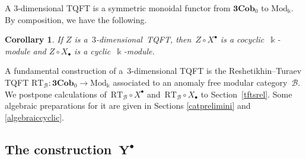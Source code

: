\documentclass[10pt,a4paper]{amsart}
\numberwithin{equation}{section}
\newtheorem{Corollary}[Theorem]{Corollary}
\newcommand{\co}{\colon}
\newcommand{\mc}{\mathcal}
\newcommand{\Mod}{\mathrm{Mod}}
\newcommand{\Cob}{\textbf{Cob}}
\newcommand{\kk}{\Bbbk}
\newcommand{\RT}{\text{RT}}
\begin{document}
A $3$-dimensional TQFT is a symmetric monoidal functor from $\textbf{3}\Cob_0$ to $\Mod_\kk$. By composition, we have the following.

\begin{Corollary} If $Z$ is a~$3$-dimensional~{TQFT}, then~$Z\circ X^\bullet$ is a cocyclic~$\kk$-module and $Z\circ X_\bullet$ is a cyclic~$\kk$-module.
\end{Corollary}
A fundamental construction of a~$3$-dimensional TQFT is the Reshetikhin--Turaev TQFT $\RT_{\mc B} \co \textbf{3}\Cob_0 \to \Mod_\kk$ associated to an anomaly free modular category~$\mc B$.
We postpone calculations of~$\RT_{\mc B}\circ X^\bullet$ and~$\RT_{\mc B}\circ X_\bullet$ to Section~\ref{tftsrel}.
Some algebraic preparations for it are given in Sections \ref{catprelimini} and \ref{algebraiccyclic}.


\subsection[The construction Y\^{}\{bullet\}]{The construction~$\boldsymbol{Y^\bullet}$}\label{construction}
\end{document}
